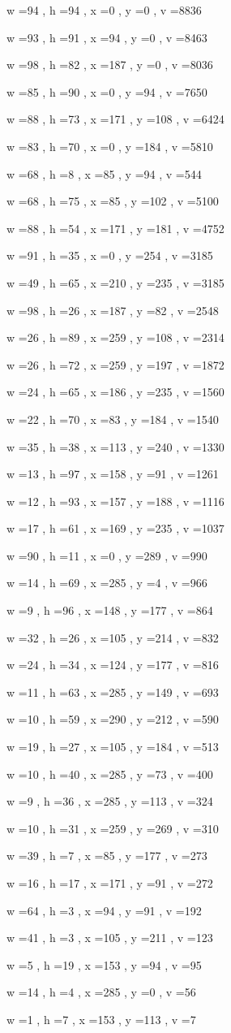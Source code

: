 \documentclass[11pt]{article}
\begin{document}
w =94 , h =94 , x =0 , y =0 , v =8836
\par
w =93 , h =91 , x =94 , y =0 , v =8463
\par
w =98 , h =82 , x =187 , y =0 , v =8036
\par
w =85 , h =90 , x =0 , y =94 , v =7650
\par
w =88 , h =73 , x =171 , y =108 , v =6424
\par
w =83 , h =70 , x =0 , y =184 , v =5810
\par
w =68 , h =8 , x =85 , y =94 , v =544
\par
w =68 , h =75 , x =85 , y =102 , v =5100
\par
w =88 , h =54 , x =171 , y =181 , v =4752
\par
w =91 , h =35 , x =0 , y =254 , v =3185
\par
w =49 , h =65 , x =210 , y =235 , v =3185
\par
w =98 , h =26 , x =187 , y =82 , v =2548
\par
w =26 , h =89 , x =259 , y =108 , v =2314
\par
w =26 , h =72 , x =259 , y =197 , v =1872
\par
w =24 , h =65 , x =186 , y =235 , v =1560
\par
w =22 , h =70 , x =83 , y =184 , v =1540
\par
w =35 , h =38 , x =113 , y =240 , v =1330
\par
w =13 , h =97 , x =158 , y =91 , v =1261
\par
w =12 , h =93 , x =157 , y =188 , v =1116
\par
w =17 , h =61 , x =169 , y =235 , v =1037
\par
w =90 , h =11 , x =0 , y =289 , v =990
\par
w =14 , h =69 , x =285 , y =4 , v =966
\par
w =9 , h =96 , x =148 , y =177 , v =864
\par
w =32 , h =26 , x =105 , y =214 , v =832
\par
w =24 , h =34 , x =124 , y =177 , v =816
\par
w =11 , h =63 , x =285 , y =149 , v =693
\par
w =10 , h =59 , x =290 , y =212 , v =590
\par
w =19 , h =27 , x =105 , y =184 , v =513
\par
w =10 , h =40 , x =285 , y =73 , v =400
\par
w =9 , h =36 , x =285 , y =113 , v =324
\par
w =10 , h =31 , x =259 , y =269 , v =310
\par
w =39 , h =7 , x =85 , y =177 , v =273
\par
w =16 , h =17 , x =171 , y =91 , v =272
\par
w =64 , h =3 , x =94 , y =91 , v =192
\par
w =41 , h =3 , x =105 , y =211 , v =123
\par
w =5 , h =19 , x =153 , y =94 , v =95
\par
w =14 , h =4 , x =285 , y =0 , v =56
\par
w =1 , h =7 , x =153 , y =113 , v =7
\par
\newpage
\end{document}
